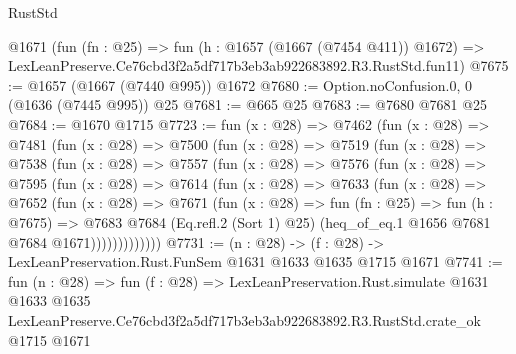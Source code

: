 \begin{lexlean}{RustStd}
\begin{coremodule}
    @1671
    (fun (fn : @25) =>
    fun (h : @1657 (@1667 (@7454 @411)) @1672) =>
    LexLeanPreserve.Ce76cbd3f2a5df717b3eb3ab922683892.R3.RustStd.fun11)
@7675 := @1657 (@1667 (@7440 @995)) @1672
@7680 := Option.noConfusion.{0, 0} (@1636 (@7445 @995)) @25
@7681 := @665 @25
@7683 := @7680 @7681 @25
@7684 := @1670 @1715
@7723 := fun (x : @28) =>
  @7462
    (fun (x : @28) =>
    @7481
      (fun (x : @28) =>
      @7500
        (fun (x : @28) =>
        @7519
          (fun (x : @28) =>
          @7538
            (fun (x : @28) =>
            @7557
              (fun (x : @28) =>
              @7576
                (fun (x : @28) =>
                @7595
                  (fun (x : @28) =>
                  @7614
                    (fun (x : @28) =>
                    @7633
                      (fun (x : @28) =>
                      @7652
                        (fun (x : @28) =>
                        @7671
                          (fun (x : @28) =>
                          fun (fn : @25) =>
                          fun (h : @7675) =>
                          @7683
                            @7684
                            (Eq.refl.{2} (Sort 1) @25)
                            (heq_of_eq.{1} @1656 @7681 @7684 @1671)))))))))))))
@7731 := (n : @28) -> (f : @28) -> LexLeanPreservation.Rust.FunSem @1631 @1633 @1635 @1715 @1671
@7741 := fun (n : @28) =>
  fun (f : @28) =>
  LexLeanPreservation.Rust.simulate
    @1631
    @1633
    @1635
    LexLeanPreserve.Ce76cbd3f2a5df717b3eb3ab922683892.R3.RustStd.crate_ok
    @1715
    @1671
\end{coremodule}
\end{lexlean}
